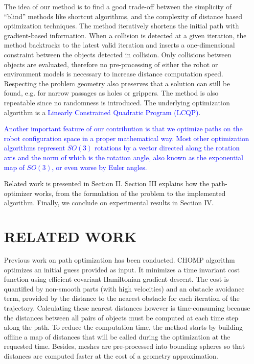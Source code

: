 \documentclass{tADR2e}
\begin{document}
The idea of our method is to find a good trade-off between
the simplicity of “blind” methods like shortcut algorithms,
and the complexity of distance based optimization techniques.
The method iteratively shortens the initial path with gradient-based information.
When a collision is detected at a given iteration, the method backtracks to the
latest valid iteration and inserts a one-dimensional constraint
between the objects detected in collision. Only collisions between objects are 
evaluated, therefore no pre-processing of either the
robot or environment models is necessary to increase distance computation speed. 
Respecting the problem geometry also 
preserves that a solution can still be found, e.g. for narrow passages as holes or 
grippers. The method is also repeatable since no randomness is introduced. The underlying optimization algorithm is a \textcolor{blue}{Linearly Constrained Quadratic Program (LCQP)}.

\textcolor{blue}{Another important feature of our contribution is that we optimize paths on the robot configuration space in a proper mathematical way. Most other optimization algorithms represent $SO(3)$ rotations by a vector directed along the rotation axis and the norm of which is the rotation angle, also known as the exponential map of $SO(3)$, or even worse by Euler angles.}

Related work is presented in Section II. Section III explains how the 
path-optimizer works, from the formulation of the problem to the implemented
algorithm. Finally, we conclude on experimental results in Section IV.

\section{RELATED WORK}
Previous work on path optimization has been conducted. CHOMP algorithm~\cite{chompIjrr} optimizes an initial guess provided as
input. It minimizes a time invariant cost function using efficient covariant
Hamiltonian gradient descent. The cost is quantified by non-smooth parts (with
high velocities) and an obstacle avoidance term, provided by the distance to the 
nearest obstacle for each iteration of the trajectory. Calculating these nearest 
distances however is time-consuming because the distances between all pairs of 
objects must be computed at each time step along the path. To reduce the 
computation time, the method starts by building offline a map of distances that 
will be called during the optimization at the requested time. Besides, meshes 
are pre-processed into bounding spheres so that distances are computed faster 
at the cost of a geometry approximation.
\end{document}
